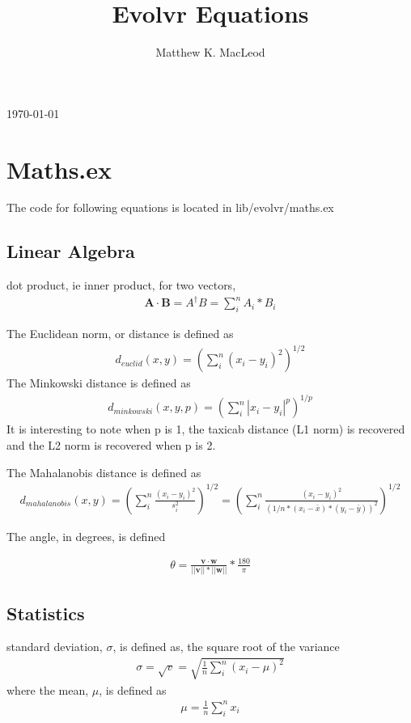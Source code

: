 \documentclass[jcp,aip,amsmath]{revtex4-1}
\begin{document}
\title{Evolvr Equations}
\author{Matthew K. MacLeod}
\maketitle
\today

\section{Maths.ex}
The code for following equations is located in lib/evolvr/maths.ex

\subsection{Linear Algebra}
dot product, ie inner product, for two vectors,
\begin{align}
\mathbf{A} \cdot \mathbf{B} = A^\dag B = \sum_i^n A_i * B_i
\end{align}

The Euclidean norm, or distance is defined as
\begin{align}
d_{euclid} (x,y) = \left( \sum_i^n (x_i - y_i)^2 \right)^{1/2}
\end{align}
The Minkowski distance is defined as
\begin{align}
d_{minkowski} (x,y,p) = \left( \sum_i^n |x_i - y_i|^{p} \right)^{1/p}
\end{align}
It is interesting to note when p is 1, the taxicab distance (L1 norm) is recovered and
the L2 norm is recovered when p is 2.

The Mahalanobis distance is defined as
\begin{align}
d_{mahalanobis} (x,y) = \left( \sum_i^n \frac{(x_i - y_i)^2}{s^2_i} \right)^{1/2} = \left( \sum_i^n \frac{(x_i - y_i)^2}{ \left(1/n *(x_i - \bar{x})*(y_i-\bar{y})\right)^2} \right)^{1/2}
\end{align}

The angle, in degrees, is defined

\begin{align}
\theta = \frac{\mathbf{v} \cdot \mathbf{w}}{||\mathbf{v}||*||\mathbf{w}||} * \frac{180}{\pi}
\end{align}

\subsection{Statistics}

standard deviation, $\sigma$, is defined as, the square root of the variance
\begin{align}
\sigma = \sqrt{v} =  \sqrt{\frac{1}{n}\sum_i^n (x_i - \mu)^2}
\end{align}
where the mean, $\mu$, is defined as
\begin{align}
\mu = \frac{1}{n} \sum_i^n x_i
\end{align}
\end{document}
